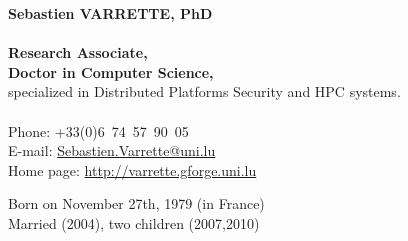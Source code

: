 \documentclass{cv}
\begin{document}
\begin{chapeau}
    \begin{adresse}
        {\Large\textbf{Sebastien VARRETTE, PhD}}\\
        \ligne\\
        \textbf{Research Associate,}\\
        \textbf{Doctor in Computer Science,}\\
        specialized in Distributed Platforms Security and HPC systems.\\
        \ligne\\
        Phone: +33(0)6~74~57~90~05\\
        E-mail:    \url{Sebastien.Varrette@uni.lu}\\
        Home page: \url{http://varrette.gforge.uni.lu}
    \end{adresse}
    \begin{etatcivil}

        Born on November 27th, 1979 (in France)\\
        Married (2004), two children (2007,2010)\\
    \end{etatcivil}
\end{chapeau}
\end{document}
